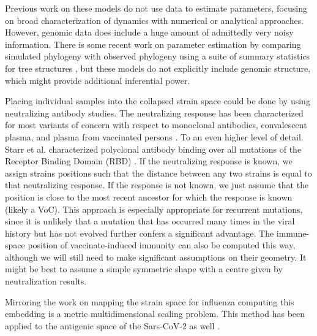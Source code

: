 \documentclass{article}
\begin{document}
Previous work on these models do not use data to estimate parameters, focusing on broad characterization of dynamics with numerical or analytical approaches. However, genomic data does include a huge amount of admittedly very noisy information. There is some recent work on parameter estimation by comparing simulated phylogeny with observed phylogeny using a suite of summary statistics for tree structures \cite{danesh2021quantifying,leventhal2012inferring,saulnier2017inferring}, but these models do not explicitly include genomic structure, which might provide additional inferential power. 

Placing individual samples into the collapsed strain space could be done by using neutralizing antibody studies. The neutralizing response has been characterized for most variants of concern with respect to monoclonal antibodies, convalescent plasma, and plasma from vaccinated persons \cite{stanford2020}. To an even higher level of detail. Starr et al. characterized polyclonal antibody binding over all mutations of the Receptor Binding Domain (RBD) \cite{starr2020deep}. If the neutralizing response is known, we assign strains positions such that the distance between any two strains is equal to that neutralizing response. If the response is not known, we just assume that the position is close to the most recent ancestor for which the response is known (likely a VoC). This approach is especially appropriate for recurrent mutations, since it is unlikely that a mutation that has occurred many times in the viral history but has not evolved further confers a significant advantage. The immune-space position of vaccinate-induced immunity can also be computed this way, although we will still need to make significant assumptions on their geometry. It might be best to assume a simple symmetric shape with a centre given by neutralization results. 

Mirroring the work on mapping the strain space for influenza \cite{lapedesGeometryShapeSpace2001, smithMappingAntigenicGenetic2004, cai2010computational} computing this embedding is a metric multidimensional scaling problem. This method has been applied to the antigenic space of the Sars-CoV-2 as well \cite{millerAntigenicSpaceFramework2021, wilksMappingSARSCoV2Antigenic2022, van2022mapping}. 



\end{document}
